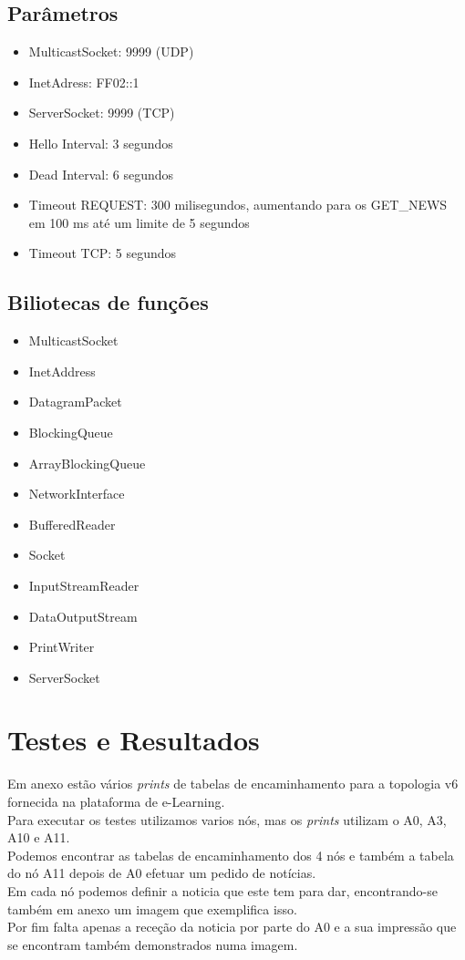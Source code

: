 \documentclass{llncs}
\begin{document}
\subsection{Parâmetros}

\begin{itemize}
    \item MulticastSocket: 9999 (UDP)
    \item InetAdress: FF02::1
    \item ServerSocket: 9999 (TCP)
    \item Hello Interval: 3 segundos
    \item Dead Interval: 6 segundos
    \item Timeout REQUEST: 300 milisegundos, aumentando para os GET\_NEWS em 100 ms até um limite de 5 segundos
    \item Timeout TCP: 5 segundos
\end{itemize}

\subsection{Biliotecas de funções}

\begin{itemize}
    \item MulticastSocket
    \item InetAddress
    \item DatagramPacket
    \item BlockingQueue
    \item ArrayBlockingQueue
    \item NetworkInterface
    \item BufferedReader
    \item Socket
    \item InputStreamReader
    \item DataOutputStream
    \item PrintWriter
    \item ServerSocket
\end{itemize}

\section{Testes e Resultados}

Em anexo estão vários \emph{prints} de tabelas de encaminhamento para a topologia v6 fornecida na plataforma de e-Learning.\\

Para executar os testes utilizamos varios nós, mas os \emph{prints} utilizam o A0, A3, A10 e A11.\\
Podemos encontrar as tabelas de encaminhamento dos 4 nós e também a tabela do nó A11 depois de A0 efetuar um pedido de notícias.\\
Em cada nó podemos definir a noticia que este tem para dar, encontrando-se também em anexo um imagem que exemplifica isso.\\
Por fim falta apenas a receção da noticia por parte do A0 e a sua impressão que se encontram também demonstrados numa imagem.\\
\end{document}
